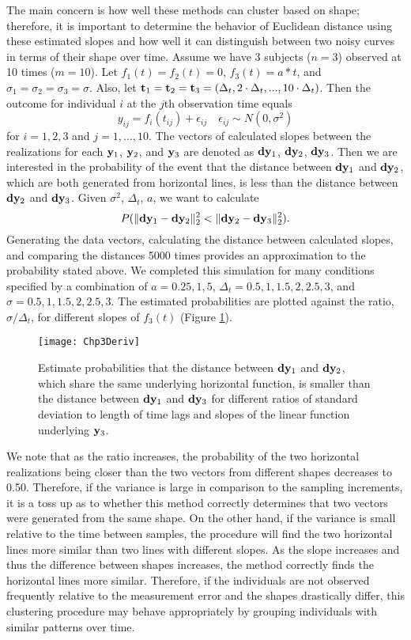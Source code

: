 The main concern is how well these methods can cluster based on shape; therefore, it is important to determine the behavior of Euclidean distance using these estimated slopes and how well it can distinguish between two noisy curves in terms of their shape over time. Assume we have 3 subjects ($n=3$) observed at 10 times ($m=10$). Let $f_1(t) = f_2(t) =0$, $f_3(t)=a*t$, and $\sigma_1=\sigma_2=\sigma_3=\sigma$. Also, let $\mathbf t_1 = \mathbf t_2=\mathbf t_3 = (\Delta_t,2\cdot\Delta_t,...,10\cdot\Delta_t)$. Then the outcome for individual $i$ at the $j$th observation time equals
$$y_{ij}=f_{i}(t_{ij})+\epsilon_{ij}\quad \epsilon_{ij}\sim N(0,\sigma^{2})$$
for $i=1,2,3$ and $j=1,...,10$. The vectors of calculated slopes between the realizations for each $\mathbf y_1$, $\mathbf y_2$, and $\mathbf y_3$ are denoted as $\mathbf d\mathbf y_1$, $\mathbf d\mathbf y_2$, $\mathbf d\mathbf y_3$. Then we are interested in the probability of the event that the distance between $\mathbf d\mathbf y_1$ and $\mathbf d\mathbf y_2$, which are both generated from horizontal lines, is less than the distance between $\mathbf d\mathbf y_2$ and $\mathbf d\mathbf y_3$. Given $\sigma^2$, $\Delta_t$, $a$, we want to calculate 
$$P(\|\mathbf d\mathbf y_1-\mathbf d\mathbf y_2\|^2_2 < \|\mathbf d\mathbf y_2-\mathbf d\mathbf y_3\|^{2}_{2}).$$
Generating the data vectors, calculating the distance between calculated slopes, and comparing the distances 5000 times provides an approximation to the probability stated above. We completed this simulation for many conditions specified by a combination of $a = 0.25, 1, 5$, $\Delta_t = 0.5,1,1.5,2,2.5,3$, and $\sigma = 0.5,1,1.5,2,2.5,3$. The estimated probabilities are plotted against the ratio, $\sigma/\Delta_t$, for different slopes of $f_{3}(t)$ (Figure \ref{fig:3-3}). 

\begin{figure}
\begin{center}
\texttt{[image: Chp3Deriv]}
\end{center}
\caption{Estimate probabilities that the distance between $\mathbf d\mathbf y_{1}$ and $\mathbf d\mathbf y_{2}$, which share the same underlying horizontal function, is smaller than the distance between $\mathbf d\mathbf y_{1}$ and $\mathbf d\mathbf y_{3}$ for different ratios of standard deviation to length of time lags and slopes of the linear function underlying $\mathbf y_{3}$.}
\label{fig:3-3} 
\end{figure}

We note that as the ratio increases, the probability of the two horizontal realizations being closer than the two vectors from different shapes decreases to 0.50. Therefore, if the variance is large in comparison to the sampling increments, it is a toss up as to whether this method correctly determines that two vectors were generated from the same shape. On the other hand, if the variance is small relative to the time between samples, the procedure will find the two horizontal lines more similar than two lines with different slopes. As the slope increases and thus the difference between shapes increases, the method correctly finds the horizontal lines more similar. Therefore, if the individuals are not observed frequently relative to the measurement error and the shapes drastically differ, this clustering procedure may behave appropriately by grouping individuals with similar patterns over time. 

